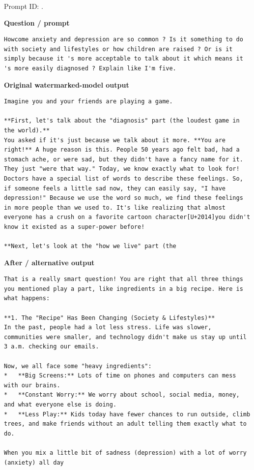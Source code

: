 Prompt ID:
\texttt{}.

\textbf{Question / prompt}

\begin{Verbatim}
Howcome anxiety and depression are so common ? Is it something to do with society and lifestyles or how children are raised ? Or is it simply because it 's more acceptable to talk about it which means it 's more easily diagnosed ? Explain like I'm five.
\end{Verbatim}

\textbf{Original watermarked-model output}

\begin{Verbatim}
Imagine you and your friends are playing a game.

**First, let's talk about the "diagnosis" part (the loudest game in the world).**
You asked if it's just because we talk about it more. **You are right!** A huge reason is this. People 50 years ago felt bad, had a stomach ache, or were sad, but they didn't have a fancy name for it. They just "were that way." Today, we know exactly what to look for! Doctors have a special list of words to describe these feelings. So, if someone feels a little sad now, they can easily say, "I have depression!" Because we use the word so much, we find these feelings in more people than we used to. It's like realizing that almost everyone has a crush on a favorite cartoon character[U+2014]you didn't know it existed as a super-power before!

**Next, let's look at the "how we live" part (the
\end{Verbatim}

\textbf{After / alternative output}

\begin{Verbatim}
That is a really smart question! You are right that all three things you mentioned play a part, like ingredients in a big recipe. Here is what happens:

**1. The "Recipe" Has Been Changing (Society & Lifestyles)**
In the past, people had a lot less stress. Life was slower, communities were smaller, and technology didn't make us stay up until 3 a.m. checking our emails.

Now, we all face some "heavy ingredients":
*   **Big Screens:** Lots of time on phones and computers can mess with our brains.
*   **Constant Worry:** We worry about school, social media, money, and what everyone else is doing.
*   **Less Play:** Kids today have fewer chances to run outside, climb trees, and make friends without an adult telling them exactly what to do.

When you mix a little bit of sadness (depression) with a lot of worry (anxiety) all day
\end{Verbatim}

